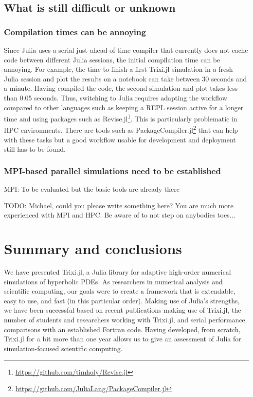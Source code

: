 \documentclass{juliacon}
\newcommand{\trixi}{Trixi.jl\xspace}
\newcommand{\todo}[1]{{\color{red}#1}}
\begin{document}
\subsection{What is still difficult or unknown}

\subsubsection{Compilation times can be annoying}

Since Julia uses a serial just-ahead-of-time compiler that currently does not cache
code between different Julia sessions, the initial compilation time can be
annoying. For example, the time to finish a first \trixi simulation in a fresh Julia
session and plot the results on a notebook can take between 30 seconds and a
minute. Having compiled the code, the second simulation and plot takes less than
0.05 seconds. Thus, switching to Julia requires adapting the workflow compared
to other languages such as keeping a REPL session active for a longer time and
using packages such as Revise.jl\footnote{\url{https://github.com/timholy/Revise.jl}}.
This is particularly problematic in HPC environments. There are tools such as
PackageCompiler.jl\footnote{\url{https://github.com/JuliaLang/PackageCompiler.jl}}
that can help with these tasks but a good workflow usable for development and
deployment still has to be found.

\subsubsection{MPI-based parallel simulations need to be established}

MPI: To be evaluated but the basic tools are already there \cite{byrne2021mpi}

\todo{TODO: Michael, could you please write something here? You are much more
experienced with MPI and HPC. Be aware of \cite{omlin2020solving} to not step
on anybodies toes...} %


\section{Summary and conclusions}
\label{sec:summary}

We have presented \trixi, a Julia library for adaptive high-order numerical
simulations of hyperbolic PDEs. As researchers in numerical analysis and
scientific computing, our goals were to create a framework that is extendable,
easy to use, and fast (in this particular order). Making use of Julia's strengths,
we have been successful based on recent publications making use of \trixi,
the number of students and researchers working with \trixi, and serial performance
comparisons with an established Fortran code. Having developed, from scratch, \trixi for a bit
more than one year allows us to give an assessment of Julia for simulation-focused
scientific computing.
\end{document}
